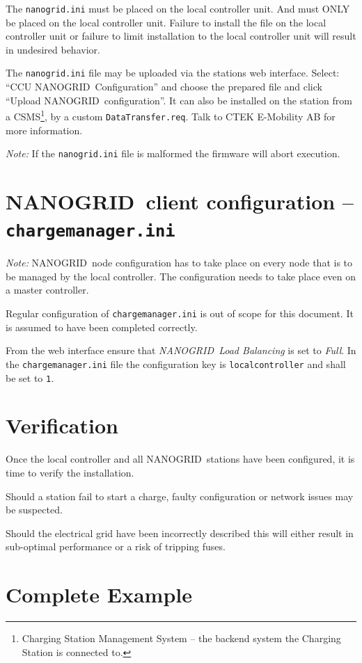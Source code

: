 \documentclass[10pt,a4paper,oneside,headings=big,headsepline]{scrreprt}
\newcommand{\nanogrid}{NANOGRID\texttrademark}
\begin{document}
The \verb|nanogrid.ini| must be placed on the local controller unit. And must
ONLY be placed on the local controller unit. Failure to install the file on
the local controller unit or failure to limit installation to the local
controller unit will result in undesired behavior.

The \verb|nanogrid.ini| file may be uploaded via the stations web
interface. Select: ``CCU \nanogrid\ Configuration'' and choose the prepared file
and click ``Upload \nanogrid\ configuration''.  It can also be installed on
the station from a CSMS\footnote{Charging Station Management System -- the
  backend system the Charging Station is connected to.}, by a custom
\verb|DataTransfer.req|. Talk to CTEK E-Mobility AB for more information.

\emph{Note:} If the \verb|nanogrid.ini| file is malformed the firmware will
abort execution.

\section{\nanogrid\ client configuration -- \texttt{chargemanager.ini}}

\emph{Note:} \nanogrid\ node configuration has to take place on every node
that is to be managed by the local controller. The configuration needs to take
place even on a master controller.

Regular configuration of \verb|chargemanager.ini| is out of scope for this
document. It is assumed to have been completed correctly.

From the web interface ensure that \emph{\nanogrid\ Load Balancing} is set to
\emph{Full}. In the \verb|chargemanager.ini| file the configuration key is
\verb|localcontroller| and shall be set to \verb|1|.


\section{Verification}

Once the local controller and all \nanogrid\ stations have been
configured, it is time to verify the installation.

Should a station fail to start a charge, faulty configuration or
network issues may be suspected.

Should the electrical grid have been incorrectly described this will
either result in sub-optimal performance or a risk of tripping fuses.

\section{Complete Example}
\end{document}
